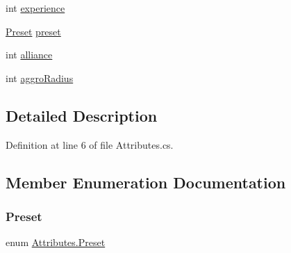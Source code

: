 \begin{DoxyCompactItemize}
\item 
int \mbox{\hyperlink{class_attributes_a43e363930def648b36c6e420290f215c}{experience}}
\item 
\mbox{\hyperlink{class_attributes_a2dcc4757e5dd7b7d518f43f4f194d175}{Preset}} \mbox{\hyperlink{class_attributes_ad6b0d037f9b58413a7cb7be3065cf743}{preset}}
\item 
int \mbox{\hyperlink{class_attributes_a8b2810971ac5f6ab1ec3c0b00498ee5b}{alliance}}
\item 
int \mbox{\hyperlink{class_attributes_aeb2c4d8fb766486fb2302a8e196594a3}{aggro\+Radius}}
\end{DoxyCompactItemize}


\subsection{Detailed Description}


Definition at line 6 of file Attributes.\+cs.



\subsection{Member Enumeration Documentation}
\mbox{\label{class_attributes_a2dcc4757e5dd7b7d518f43f4f194d175}} 
\subsubsection{\texorpdfstring{Preset}{Preset}}
{\footnotesize\ttfamily enum \mbox{\hyperlink{class_attributes_a2dcc4757e5dd7b7d518f43f4f194d175}{Attributes.\+Preset}}\hspace{0.3cm}{\ttfamily [strong]}}

